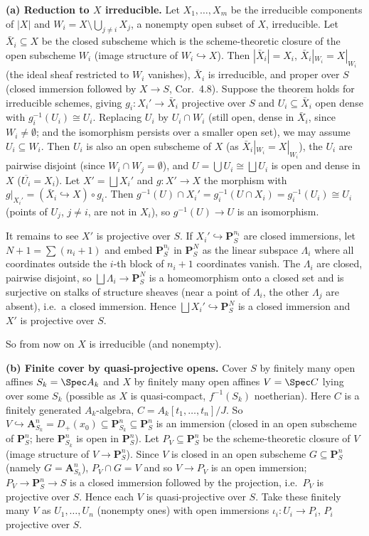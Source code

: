 \documentclass[11pt]{article}
\begin{document}
\textbf{(a) Reduction to $X$ irreducible.} Let $X_1,\dots,X_m$ be the irreducible components of $|X|$ and $W_i=X\setminus\bigcup_{j\neq i}X_j$, a nonempty open subset of $X$, irreducible. Let $\bar X_i\subseteq X$ be the closed subscheme which is the scheme-theoretic closure of the open subscheme $W_i$ (image structure of $W_i\hookrightarrow X$). Then $|\bar X_i|=X_i$, $\bar X_i|_{W_i}=X|_{W_i}$ (the ideal sheaf restricted to $W_i$ vanishes), $\bar X_i$ is irreducible, and proper over $S$ (closed immersion followed by $X\to S$, Cor.~4.8). Suppose the theorem holds for irreducible schemes, giving $g_i:X_i'\to\bar X_i$ projective over $S$ and $U_i\subseteq\bar X_i$ open dense with $g_i^{-1}(U_i)\cong U_i$. Replacing $U_i$ by $U_i\cap W_i$ (still open, dense in $\bar X_i$, since $W_i\neq\emptyset$; and the isomorphism persists over a smaller open set), we may assume $U_i\subseteq W_i$. Then $U_i$ is also an open subscheme of $X$ (as $\bar X_i|_{W_i}=X|_{W_i}$), the $U_i$ are pairwise disjoint (since $W_i\cap W_j=\emptyset$), and $U=\bigcup U_i\cong\bigsqcup U_i$ is open and dense in $X$ ($\overline{U_i}=X_i$). Let $X'=\bigsqcup X_i'$ and $g:X'\to X$ the morphism with $g|_{X_i'}=(\bar X_i\hookrightarrow X)\circ g_i$. Then $g^{-1}(U)\cap X_i'=g_i^{-1}(U\cap X_i)=g_i^{-1}(U_i)\cong U_i$ (points of $U_j$, $j\ne i$, are not in $X_i$), so $g^{-1}(U)\to U$ is an isomorphism.

It remains to see $X'$ is projective over $S$. If $X_i'\hookrightarrow\mathbf P^{n_i}_S$ are closed immersions, let $N+1=\sum(n_i+1)$ and embed $\mathbf P^{n_i}_S$ in $\mathbf P^N_S$ as the linear subspace $\Lambda_i$ where all coordinates outside the $i$-th block of $n_i+1$ coordinates vanish. The $\Lambda_i$ are closed, pairwise disjoint, so $\bigsqcup\Lambda_i\to\mathbf P^N_S$ is a homeomorphism onto a closed set and is surjective on stalks of structure sheaves (near a point of $\Lambda_i$, the other $\Lambda_j$ are absent), i.e.\ a closed immersion. Hence $\bigsqcup X_i'\hookrightarrow\mathbf P^N_S$ is a closed immersion and $X'$ is projective over $S$.

So from now on $X$ is irreducible (and nonempty).

\textbf{(b) Finite cover by quasi-projective opens.} Cover $S$ by finitely many open affines $S_k=\Spec A_k$ and $X$ by finitely many open affines $V=\Spec C$ lying over some $S_k$ (possible as $X$ is quasi-compact, $f^{-1}(S_k)$ noetherian). Here $C$ is a finitely generated $A_k$-algebra, $C=A_k[t_1,\dots,t_n]/J$. So $V\hookrightarrow\mathbf A^n_{S_k}=D_+(x_0)\subseteq\mathbf P^n_{S_k}\subseteq\mathbf P^n_S$ is an immersion (closed in an open subscheme of $\mathbf P^n_S$; here $\mathbf P^n_{S_k}$ is open in $\mathbf P^n_S$). Let $P_V\subseteq\mathbf P^n_S$ be the scheme-theoretic closure of $V$ (image structure of $V\to\mathbf P^n_S$). Since $V$ is closed in an open subscheme $G\subseteq\mathbf P^n_S$ (namely $G=\mathbf A^n_{S_k}$), $P_V\cap G=V$ and so $V\to P_V$ is an open immersion; $P_V\to\mathbf P^n_S\to S$ is a closed immersion followed by the projection, i.e.\ $P_V$ is projective over $S$. Hence each $V$ is quasi-projective over $S$. Take these finitely many $V$ as $U_1,\dots,U_n$ (nonempty ones) with open immersions $\iota_i:U_i\to P_i$, $P_i$ projective over $S$.
\end{document}
